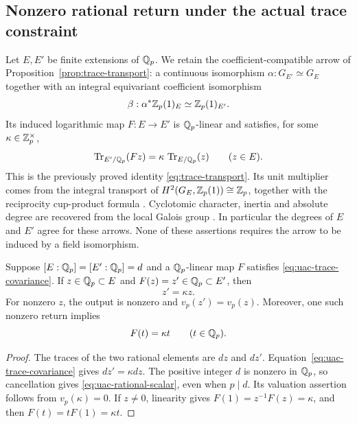 \subsection{Nonzero rational return under the actual trace constraint}

Let $E,E'$ be finite extensions of $\mathbb Q_p$. We retain the
coefficient-compatible arrow of Proposition~\ref{prop:trace-transport}:
a continuous isomorphism $\alpha:G_{E'}\simeq G_E$ together with
an integral equivariant coefficient isomorphism
\[
 \beta:\alpha^*\mathbb Z_p(1)_E\simeq\mathbb Z_p(1)_{E'}.
\]
Its induced logarithmic map $F:E\longrightarrow E'$ is $\mathbb Q_p$-linear
and satisfies, for some $\kappa\in\mathbb Z_p^\times$,
\begin{equation}\label{eq:uac-trace-covariance}
 \operatorname{Tr}_{E'/\mathbb Q_p}(Fz)
                 =\kappa\,\operatorname{Tr}_{E/\mathbb Q_p}(z)
                 \qquad(z\in E).
\end{equation}
This is the previously proved identity \eqref{eq:trace-transport}.
Its unit multiplier comes from the integral transport of
$H^2(G_E,\mathbb Z_p(1))\cong\mathbb Z_p$, together with the reciprocity
cup-product formula
\cite[Chapter~III, Proposition~3.6 and \S4]{MilneCFT}.
Cyclotomic character, inertia and absolute degree are recovered from
the local Galois group
\cite[Propositions~1.1--1.2 and Corollary~1.3]{MochLocal}.
In particular the degrees of $E$ and $E'$ agree for these arrows.
None of these assertions requires the arrow to be induced by a field
isomorphism.

\begin{lemma}
\label{lem:uac-rational-return}
Suppose $[E:\mathbb Q_p]=[E':\mathbb Q_p]=d$ and a $\mathbb Q_p$-linear map $F$
satisfies \eqref{eq:uac-trace-covariance}.
If $z\in\mathbb Q_p\subset E$ and $F(z)=z'\in\mathbb Q_p\subset E'$, then
\begin{equation}\label{eq:uac-rational-scalar}
                              z'=\kappa z.
\end{equation}
For nonzero $z$, the output is nonzero and $v_p(z')=v_p(z)$.
Moreover, one such nonzero return implies
\[
                         F(t)=\kappa t\qquad(t\in\mathbb Q_p).
\]
\end{lemma}

\begin{proof}
The traces of the two rational elements are $dz$ and $dz'$.
Equation~\eqref{eq:uac-trace-covariance} gives $dz'=\kappa dz$.
The positive integer $d$ is nonzero in $\mathbb Q_p$, so cancellation
gives \eqref{eq:uac-rational-scalar}, even when $p\mid d$.
Its valuation assertion follows from $v_p(\kappa)=0$.
If $z\ne0$, linearity gives
$F(1)=z^{-1}F(z)=\kappa$, and then $F(t)=tF(1)=\kappa t$.
\end{proof}

